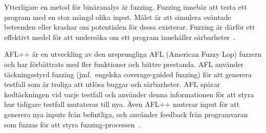 Ytterligare en metod för binäranalys är fuzzing. Fuzzing innebär att testa ett
program med en stor mängd olika input. Målet är att simulera oväntade beteenden
eller krashar om potentialen för dessa existerar. Fuzzing är därför ett
effektivt medel för att undersöka om ett program innehåller
sårbarheter~\cite{8371326}.

AFL++ är en utveckling av den ursprungliga AFL (American Fuzzy Lop) fuzzern och
har förbättrats med fler funktioner och bättre prestanda. AFL använder
täckningsstyrd fuzzing (jmf.\ engelska coverage-guided fuzzing) för att generera
testfall som är troliga att utlösa buggar och sårbarheter. AFL spårar
kodtäckningen vid varje testfall och använder denna informationen för att styra
hur tidigare testfall mutateras till nya. Även AFL++ muterar input för att
generera nya inputs från befintliga, och använder feedback från programvaran som
fuzzas för att styra fuzzing-processen~\cite{aflplusplus}.
